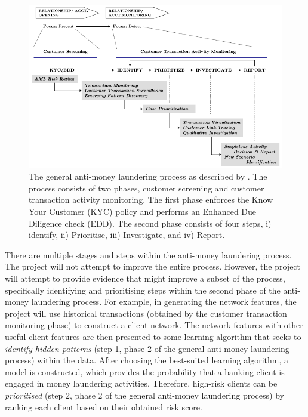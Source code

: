 \begin{figure}[h]
	\begin{center}
		\includegraphics[scale=0.75]{fig/CH2/aml_process_02.png}
		\caption{The general anti-money laundering process as described by \citet{sudjianto2010statistical}. The process consists of two phases, customer screening and customer transaction activity monitoring. The first phase enforces the Know Your Customer (KYC) policy and performs an Enhanced Due Diligence check (EDD). The second phase consists of four steps, i) identify, ii) Prioritise, iii) Investigate, and iv) Report.}
		\label{fig:ch2_aml_process}
	\end{center}	
\end{figure}

There are multiple stages and steps within the anti-money laundering process. The project will not attempt to improve the entire process. However, the project will attempt to provide evidence that might improve a subset of the process, specifically identifying and prioritising steps within the second phase of the anti-money laundering process. For example, in generating the network features, the project will use historical transactions (obtained by the customer transaction monitoring phase) to construct a client network. The network features with other useful client features are then presented to some learning algorithm that seeks to \textit{identify hidden patterns} (step 1, phase 2 of the general anti-money laundering process) within the data. After choosing the best-suited learning algorithm, a model is constructed, which provides  the probability that a banking client is engaged in money laundering activities. Therefore, high-risk clients can be \textit{prioritised} (step 2, phase 2 of the general anti-money laundering process) by ranking each client based on their obtained risk score.   

